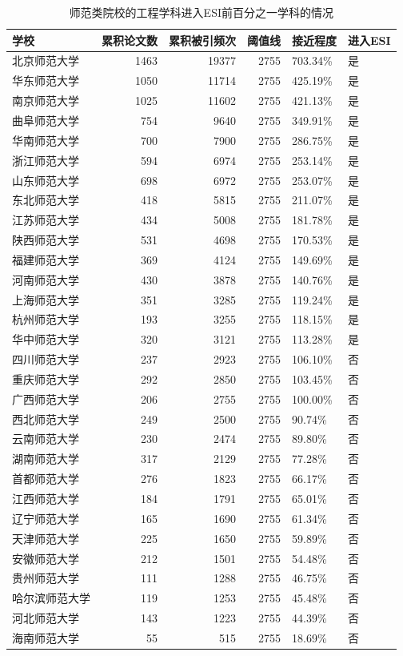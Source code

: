 \documentclass[cn, 11pt, fancy, hide]{elegantbook}
\begin{document}
\begin{table}[!h]

\caption{\label{tab:iris3}师范类院校的工程学科进入ESI前百分之一学科的情况}
\centering
\begin{tabular}[t]{lrrrll}
\toprule
学校 & 累积论文数 & 累积被引频次 & 阈值线 & 接近程度 & 进入ESI\\
\midrule
北京师范大学 & 1463 & 19377 & 2755 & 703.34\% & 是\\
华东师范大学 & 1050 & 11714 & 2755 & 425.19\% & 是\\
南京师范大学 & 1025 & 11602 & 2755 & 421.13\% & 是\\
曲阜师范大学 & 754 & 9640 & 2755 & 349.91\% & 是\\
华南师范大学 & 700 & 7900 & 2755 & 286.75\% & 是\\
\addlinespace
浙江师范大学 & 594 & 6974 & 2755 & 253.14\% & 是\\
山东师范大学 & 698 & 6972 & 2755 & 253.07\% & 是\\
东北师范大学 & 418 & 5815 & 2755 & 211.07\% & 是\\
江苏师范大学 & 434 & 5008 & 2755 & 181.78\% & 是\\
陕西师范大学 & 531 & 4698 & 2755 & 170.53\% & 是\\
\addlinespace
福建师范大学 & 369 & 4124 & 2755 & 149.69\% & 是\\
河南师范大学 & 430 & 3878 & 2755 & 140.76\% & 是\\
上海师范大学 & 351 & 3285 & 2755 & 119.24\% & 是\\
杭州师范大学 & 193 & 3255 & 2755 & 118.15\% & 是\\
华中师范大学 & 320 & 3121 & 2755 & 113.28\% & 是\\
\addlinespace
四川师范大学 & 237 & 2923 & 2755 & 106.10\% & 否\\
重庆师范大学 & 292 & 2850 & 2755 & 103.45\% & 否\\
广西师范大学 & 206 & 2755 & 2755 & 100.00\% & 否\\
西北师范大学 & 249 & 2500 & 2755 & 90.74\% & 否\\
云南师范大学 & 230 & 2474 & 2755 & 89.80\% & 否\\
\addlinespace
湖南师范大学 & 317 & 2129 & 2755 & 77.28\% & 否\\
首都师范大学 & 276 & 1823 & 2755 & 66.17\% & 否\\
江西师范大学 & 184 & 1791 & 2755 & 65.01\% & 否\\
辽宁师范大学 & 165 & 1690 & 2755 & 61.34\% & 否\\
天津师范大学 & 225 & 1650 & 2755 & 59.89\% & 否\\
\addlinespace
安徽师范大学 & 212 & 1501 & 2755 & 54.48\% & 否\\
贵州师范大学 & 111 & 1288 & 2755 & 46.75\% & 否\\
哈尔滨师范大学 & 119 & 1253 & 2755 & 45.48\% & 否\\
河北师范大学 & 143 & 1223 & 2755 & 44.39\% & 否\\
海南师范大学 & 55 & 515 & 2755 & 18.69\% & 否\\
\bottomrule
\end{tabular}
\end{table}
\end{document}
